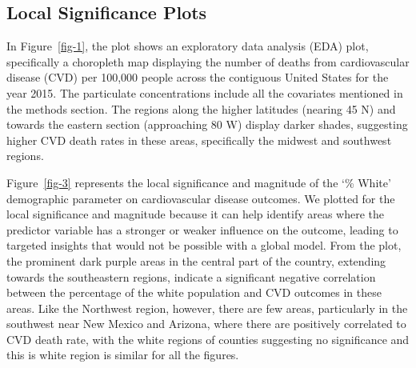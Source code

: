 \documentclass[
]{article}
\begin{document}
\begin{figure}


\caption{\label{fig-2}}

\end{figure}%

\subsection{Local Significance Plots}\label{local-significance-plots}

In Figure~\ref{fig-1}, the plot shows an exploratory data analysis (EDA)
plot, specifically a choropleth map displaying the number of deaths from
cardiovascular disease (CVD) per 100,000 people across the contiguous
United States for the year 2015. The particulate concentrations include
all the covariates mentioned in the methods section. The regions along
the higher latitudes (nearing 45 N) and towards the eastern section
(approaching 80 W) display darker shades, suggesting higher CVD death
rates in these areas, specifically the midwest and southwest regions.~

Figure~\ref{fig-3} represents the local significance and magnitude of
the `\% White' demographic parameter on cardiovascular disease outcomes.
We plotted for the local significance and magnitude because it can help
identify areas where the predictor variable has a stronger or weaker
influence on the outcome, leading to targeted insights that would not be
possible with a global model. From the plot, the prominent dark purple
areas in the central part of the country, extending towards the
southeastern regions, indicate a significant negative correlation
between the percentage of the white population and CVD outcomes in these
areas. Like the Northwest region, however, there are few areas,
particularly in the southwest near New Mexico and Arizona, where there
are positively correlated to CVD death rate, with the white regions of
counties suggesting no significance and this is white region is similar
for all the figures.
\end{document}
